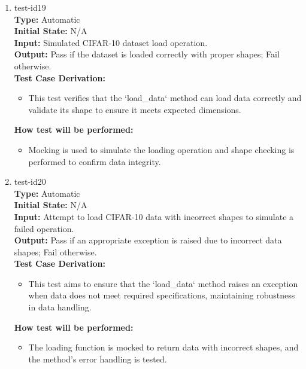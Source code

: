 \documentclass[12pt, titlepage]{article}
\begin{document}
\begin{enumerate}

\item{test-id19\\}
\textbf{Type:} Automatic\\
\textbf{Initial State:} N/A\\
\textbf{Input:} Simulated CIFAR-10 dataset load operation.\\
\textbf{Output:} Pass if the dataset is loaded correctly with proper shapes; 
Fail otherwise.\\
\textbf{Test Case Derivation:}
\begin{itemize}
    \item This test verifies that the `load\_data` method can load data correctly and 
    validate its shape to ensure it meets expected dimensions.
\end{itemize}
\textbf{How test will be performed:}
\begin{itemize}
    \item Mocking is used to simulate the loading operation and shape checking is 
    performed to confirm data integrity.
\end{itemize}

\item{test-id20\\}
\textbf{Type:} Automatic\\
\textbf{Initial State:} N/A\\
\textbf{Input:} Attempt to load CIFAR-10 data with incorrect shapes to simulate a 
failed operation.\\
\textbf{Output:} Pass if an appropriate exception is raised due to incorrect data 
shapes; Fail otherwise.\\
\textbf{Test Case Derivation:}
\begin{itemize}
    \item This test aims to ensure that the `load\_data` method raises an 
    exception when data does not meet required specifications, maintaining robustness in data handling.
\end{itemize}
\textbf{How test will be performed:}
\begin{itemize}
    \item The loading function is mocked to return data with incorrect 
    shapes, and the method's error handling is tested.
\end{itemize}


\end{enumerate}
\end{document}
